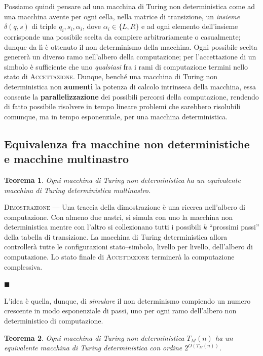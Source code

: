 \documentclass[10pt]{\classname}
\newtheorem{thm}{Teorema}
\begin{document}
Possiamo quindi pensare ad una macchina di Turing non deterministica
come ad una macchina avente per ogni cella, nella matrice di transizione, un
\emph{insieme} $\delta(q,s)$ di triple $q_i, s_i, \alpha_i$, dove $\alpha_i \in
\{L,R\}$ e ad ogni elemento dell'insieme corrisponde una possibile scelta da
compiere arbitrariamente o casualmente; dunque da lì è ottenuto il non
determinismo della macchina. Ogni possibile scelta genererà un diverso ramo
nell'albero della computazione; per l'accettazione di un simbolo è
sufficiente che uno \emph{qualsiasi} fra i rami di computazione termini nello
stato di \textsc{Accettazione}. Dunque, benché una macchina di Turing non
deterministica non \textbf{aumenti} la potenza di calcolo intrinseca della
macchina, essa consente la \textbf{parallelizzazione} dei possibili percorsi
della computazione, rendendo di fatto possibile risolvere in tempo lineare
problemi che sarebbero risolubili comunque, ma in tempo esponenziale, per una
macchina deterministica.

\subsection{Equivalenza fra macchine non deterministiche e macchine multinastro}

\begin{thm}
    Ogni macchina di Turing non deterministica ha un equivalente macchina di
    Turing deterministica multinastro.
\end{thm}

\textsc{Dimostrazione} --- Una traccia della dimostrazione è una ricerca
nell'albero di computazione. Con almeno due nastri, si simula con uno la
macchina non deterministica mentre con l'altro si collezionano tutti i
possibili $k$ ``prossimi passi'' della tabella di transizione. La macchina di
Turing deterministica allora controllerà tutte le configurazioni
stato--simbolo, livello per livello, dell'albero di computazione. Lo stato
finale di \textsc{Accettazione } terminerà la computazione complessiva.

\begin{flushright}
$\blacksquare$
\end{flushright}

L'idea è quella, dunque, di \emph{simulare} il non determinismo compiendo un
numero crescente in modo esponenziale di passi, uno per ogni ramo dell'albero
non deterministico di computazione.

\begin{thm}
    Ogni macchina di Turing non deterministica $T_M(n)$ ha un equivalente
    macchina di Turing deterministica con ordine $2^{O(T_M(n))}$.
\end{thm}
\end{document}
